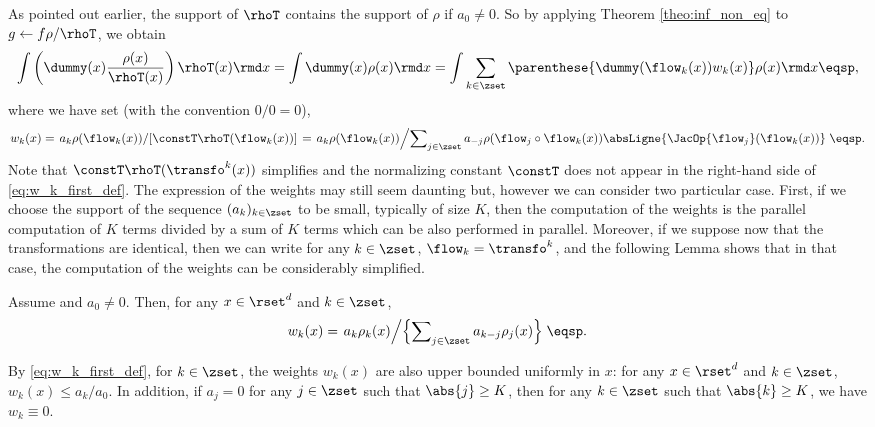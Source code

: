 As pointed out earlier, the support of $\rhoT$ contains the support of $\rho$ if $a_0 \neq 0$. So by applying Theorem \ref{theo:inf_non_eq} to $g \leftarrow f \rho /\rhoT$, we obtain 
\begin{equation}
\label{eq:key-relation}
\int \left(\dummy(x) \frac{\rho(x)}{\rhoT(x)}\right) \rhoT(x)  \rmd x =
\int \dummy(x) \rho(x)  \rmd x
=\int \sum_{k\in \zset}  \parenthese{\dummy(\flow_{k}(x)) w_k(x)} \rho(x)  \rmd x \eqsp,
\end{equation}
where we have set (with the convention $0/0=0$), 
\begin{equation}
\label{eq:w_k_first_def}
w_k(x) = \left. a_{k}  \rho(\flow_{k}(x)) \middle/ [\constT\rhoT(\flow_{k}(x))] \right. = \left. a_{k}\rho(\flow_{k}(x))\middle/ \sum\nolimits_{j\in\zset} a_{-j} \rho(\flow_{j}\circ\flow_{k}(x))\absLigne{\JacOp{\flow_j}(\flow_k(x))}\right. \eqsp.
\end{equation}
Note that $\constT\rhoT(\transfo^{k}(x))$ simplifies and the
normalizing constant $\constT$ does not appear in the right-hand
side of \eqref{eq:w_k_first_def}. The expression of the weights may
still seem daunting but, however we can consider two particular case.
First, if we choose the support of the sequence $(a_k)_{k\in\zset}$ to be small, typically of size $K$, then the computation of the weights is the parallel computation of $K$ terms divided by a sum of $K$ terms which can be also performed in parallel.
Moreover, if we suppose now that the transformations are identical, then we can write for any $k\in\zset$, $\flow_k = \transfo^k$, and the following Lemma shows that in that case, the computation of the weights can be
considerably simplified.
\begin{lemma}
\label{SPlemma:weights}
Assume  and $a_0 \neq 0$.  Then, for any $x \in \rset^d$ and $k \in \zset$,
\begin{equation}
  \label{eq:def_w_k}
    w_{k}(x) =  \left. a_{k} \rho_k(x) \middle / \left\{ \sum\nolimits_{j\in \zset} a_{k-j} \rho_{j}(x) \right\} \right. \eqsp.
\end{equation}
\end{lemma}
By \eqref{eq:w_k_first_def},  for $k \in \zset$, the weights $w_{k}(x)$ are also upper bounded uniformly in $x$: for any $x \in \rset^d$ and $k \in \zset$,  $w_{k}(x) \leq a_{k}/a_0$. In addition,
if $a_j = 0$ for any $j\in \zset$ such that $\abs{j} \geq K$, then for any $k \in \zset$ such that $\abs{k} \geq K$, we have $w_k \equiv 0$. 

